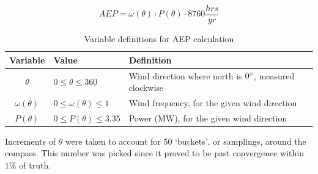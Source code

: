 \documentclass[12pt]{article}
\begin{document}
    \begin{equation}
        AEP = \omega (\theta) \cdot P (\theta) \cdot 8760 \frac{hrs}{yr}
        \label{Eq:AEP}
    \end{equation}
\vspace{-0.5cm}
    \begin{table}[H]
        \centering
        \begin{tabular}{|c|l|l|}
            \hline
            Variable & Value & Definition \\ \hline
            $\theta$ & $0 \leq \theta \leq 360$ & Wind direction where north is $0 \degree$, measured clockwise \\ \hline
            $\omega(\theta)$ & $0 \leq \omega(\theta) \leq 1$ & Wind frequency, for the given wind direction \\ \hline
            $P(\theta)$ & $0 \leq P(\theta) \leq 3.35 $ & Power (MW), for the given wind direction \\ \hline
        \end{tabular}
        \caption{Variable definitions for AEP calculation}
        \label{tab:AEP}
    \end{table}
    
    Increments of $\theta$ were taken to account for 50 `buckets', or samplings, around the compass. This number was picked since it proved to be past convergence within $1\%$ of truth.

\newpage
\section*{}


\end{document}
